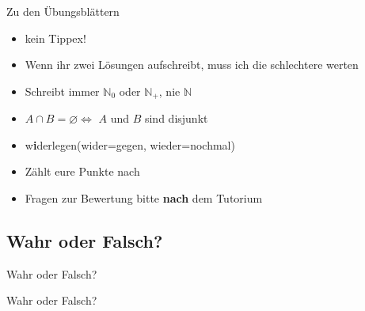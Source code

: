 



\morescalingdelimiters


\begin{frame}{Zu den Übungsblättern}
	\begin{itemize}
		\item kein Tippex!\pause
		\item Wenn ihr zwei Lösungen aufschreibt, muss ich die schlechtere werten\pause
		\item Schreibt immer $\mathbb{N}_0$ oder $\mathbb{N}_+$, nie $\mathbb{N}$\pause
		\item $A \cap B = \varnothing \Leftrightarrow$ $A$ und $B$ sind disjunkt\pause
		\item w\textbf{i}derlegen\quad(wider=gegen, wieder=nochmal)\pause
		\item Zählt eure Punkte nach\pause
		\item Fragen zur Bewertung bitte \textbf{nach} dem Tutorium
	\end{itemize}
\end{frame}

\framePrevEpisode

\subsection{Wahr oder Falsch?}
\begin{frame}[t]{Wahr oder Falsch?}
\end{frame}

\begin{frame}[t]{Wahr oder Falsch?}
	\delimitershortfall=0pt
\end{frame}

